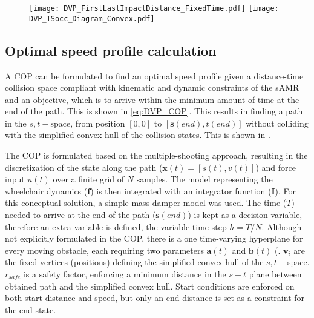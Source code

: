 \begin{figure}[!htbp]
\centering
\texttt{[image: DVP\_FirstLastImpactDistance\_FixedTime.pdf]}
\hfill
\texttt{[image: DVP\_TSocc\_Diagram\_Convex.pdf]}
\end{figure}

\newpage

\subsection{Optimal speed profile calculation} \label{sec:OSPCOP}
A COP can be formulated to find an optimal speed profile given a distance-time collision space compliant with kinematic and dynamic constraints of the sAMR and an objective, which is to arrive within the minimum amount of time at the end of the path. This is shown in \cref{eq:DVP_COP}. This results in finding a path in the $s,t-$space, from position $[0,0]$ to $[\bm{s}(end), t(end)]$ without colliding with the simplified convex hull of the collision states. This is shown in .

The COP is formulated based on the multiple-shooting approach, resulting in the discretization of the state along the path ($\bm{x}(t)=[s(t),v(t)]$) and force input $u(t)$ over a finite grid of $N$ samples. The model representing the wheelchair dynamics ($\bm{f}$) is then integrated with an integrator function ($\bm{I}$). For this conceptual solution, a simple mass-damper model was used. The time ($T$) needed to arrive at the end of the path ($\bm{s}(end)$) is kept as a decision variable, therefore an extra variable is defined, the variable time step $h=T/N$. Although not explicitly formulated in the COP, there is a one time-varying hyperplane for every moving obstacle, each requiring two parameters $\bm{a}(t)$ and $\bm{b}(t)$ (\cite{MercyEtAl2016}. $\bm{v}_{i}$ are the fixed vertices (positions) defining the simplified convex hull of the $s,t-$space. $r_{safe}$ is a safety factor, enforcing a minimum distance in the $s-t$ plane between obtained path and the simplified convex hull. Start conditions are enforced on both start distance and speed, but only an end distance is set as a constraint for the end state.


